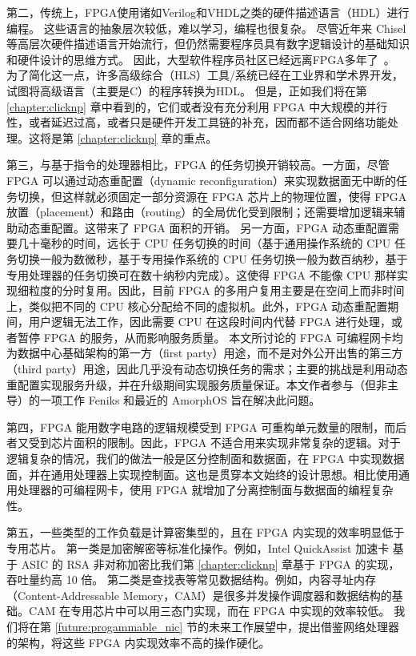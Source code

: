 第二，传统上，FPGA使用诸如Verilog和VHDL之类的硬件描述语言（HDL）进行编程。
这些语言的抽象层次较低，难以学习，编程也很复杂。
尽管近年来 Chisel 等高层次硬件描述语言开始流行，但仍然需要程序员具有数字逻辑设计的基础知识和硬件设计的思维方式。
因此，大型软件程序员社区已经远离FPGA多年了~\cite {bacon2013fpga}。
为了简化这一点，许多高级综合（HLS）工具/系统已经在工业界和学术界开发，试图将高级语言（主要是C）的程序转换为HDL。
但是，正如我们将在第 \ref{chapter:clicknp} 章中看到的，它们或者没有充分利用 FPGA 中大规模的并行性，或者延迟过高，或者只是硬件开发工具链的补充，因而都不适合网络功能处理。这将是第 \ref{chapter:clicknp} 章的重点。

第三，与基于指令的处理器相比，FPGA 的任务切换开销较高。一方面，尽管 FPGA 可以通过动态重配置（dynamic reconfiguration）来实现数据面无中断的任务切换，但这样就必须固定一部分资源在 FPGA 芯片上的物理位置，使得 FPGA 放置（placement）和路由（routing）的全局优化受到限制；还需要增加逻辑来辅助动态重配置。这带来了 FPGA 面积的开销。
另一方面，FPGA 动态重配置需要几十毫秒的时间，远长于 CPU 任务切换的时间（基于通用操作系统的 CPU 任务切换一般为数微秒，基于专用操作系统的 CPU 任务切换一般为数百纳秒，基于专用处理器的任务切换可在数十纳秒内完成）。这使得 FPGA 不能像 CPU 那样实现细粒度的分时复用。因此，目前 FPGA 的多用户复用主要是在空间上而非时间上，类似把不同的 CPU 核心分配给不同的虚拟机。此外，FPGA 动态重配置期间，用户逻辑无法工作，因此需要 CPU 在这段时间内代替 FPGA 进行处理，或者暂停 FPGA 的服务，从而影响服务质量。
本文所讨论的 FPGA 可编程网卡均为数据中心基础架构的第一方（first party）用途，而不是对外公开出售的第三方（third party）用途，因此几乎没有动态切换任务的需求；主要的挑战是利用动态重配置实现服务升级，并在升级期间实现服务质量保证。本文作者参与（但非主导）的一项工作 Feniks \cite{zhang2017feniks} 和最近的 AmorphOS \cite{khawaja2018sharing} 旨在解决此问题。

第四，FPGA 能用数字电路的逻辑规模受到 FPGA 可重构单元数量的限制，而后者又受到芯片面积的限制。因此，FPGA 不适合用来实现非常复杂的逻辑。对于逻辑复杂的情况，我们的做法一般是区分控制面和数据面，在 FPGA 中实现数据面，并在通用处理器上实现控制面。这也是贯穿本文始终的设计思想。相比使用通用处理器的可编程网卡，使用 FPGA 就增加了分离控制面与数据面的编程复杂性。

第五，一些类型的工作负载是计算密集型的，且在 FPGA 内实现的效率明显低于专用芯片。
第一类是加密解密等标准化操作。例如，Intel QuickAssist 加速卡 \cite{intel-qat} 基于 ASIC 的 RSA 非对称加密比我们第 \ref{chapter:clicknp} 章基于 FPGA 的实现，吞吐量约高 10 倍。
第二类是查找表等常见数据结构。例如，内容寻址内存（Content-Addressable Memory，CAM）是很多并发操作调度器和数据结构的基础。CAM 在专用芯片中可以用三态门实现，而在 FPGA 中实现的效率较低。
我们将在第 \ref{future:progammable_nic} 节的未来工作展望中，提出借鉴网络处理器的架构，将这些 FPGA 内实现效率不高的操作硬化。


